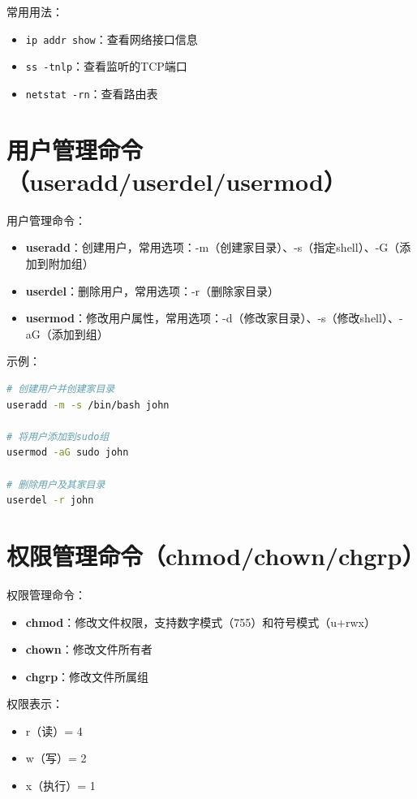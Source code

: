 \documentclass[12pt,UTF8]{ctexbook}
\begin{document}
常用用法：
\begin{itemize}
    \item \texttt{ip addr show}：查看网络接口信息
    \item \texttt{ss -tnlp}：查看监听的TCP端口
    \item \texttt{netstat -rn}：查看路由表
\end{itemize}

\section{用户管理命令（useradd/userdel/usermod）}
\label{sec:user-cmds}

用户管理命令：

\begin{itemize}
    \item \textbf{useradd}：创建用户，常用选项：-m（创建家目录）、-s（指定shell）、-G（添加到附加组）
    \item \textbf{userdel}：删除用户，常用选项：-r（删除家目录）
    \item \textbf{usermod}：修改用户属性，常用选项：-d（修改家目录）、-s（修改shell）、-aG（添加到组）
\end{itemize}

示例：
\begin{lstlisting}[language=bash]
# 创建用户并创建家目录
useradd -m -s /bin/bash john

# 将用户添加到sudo组
usermod -aG sudo john

# 删除用户及其家目录
userdel -r john
\end{lstlisting}

\section{权限管理命令（chmod/chown/chgrp）}
\label{sec:perm-cmds}

权限管理命令：

\begin{itemize}
    \item \textbf{chmod}：修改文件权限，支持数字模式（755）和符号模式（u+rwx）
    \item \textbf{chown}：修改文件所有者
    \item \textbf{chgrp}：修改文件所属组
\end{itemize}

权限表示：
\begin{itemize}
    \item r（读）= 4
    \item w（写）= 2
    \item x（执行）= 1
\end{itemize}
\end{document}
